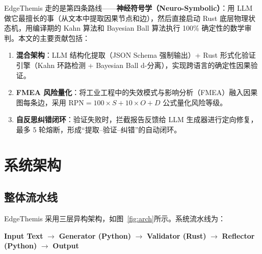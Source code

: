 \documentclass[12pt, a4paper]{ctexart}
\begin{document}
EdgeThemis 走的是第四条路线——\textbf{神经符号学（Neuro-Symbolic）}：用 LLM 做它最擅长的事（从文本中提取因果节点和边），然后直接启动 Rust 底层物理状态机，用编译期的 Kahn 算法和 Bayesian Ball 算法执行 100\% 确定性的数学审判。本文的主要贡献包括：

\begin{enumerate}[label=(\arabic*)]
  \item \textbf{混合架构}：LLM 结构化提取（JSON Schema 强制输出）+ Rust 形式化验证引擎（Kahn 环路检测 + Bayesian Ball d-分离），实现跨语言的确定性因果验证。

  \item \textbf{FMEA 风险量化}：将工业工程中的失效模式与影响分析（FMEA）融入因果图每条边，采用 RPN$=100 \times S + 10 \times O + D$ 公式量化风险等级。

  \item \textbf{自反思纠错闭环}：验证失败时，拦截报告反馈给 LLM 生成器进行定向修复，最多 5 轮熔断，形成``提取--验证--纠错''的自动闭环。
\end{enumerate}

\section{系统架构}

\subsection{整体流水线}

EdgeThemis 采用三层异构架构，如图~\ref{fig:arch}所示。系统流水线为：

\begin{center}
\textbf{Input Text} $\to$ \textbf{Generator (Python)} $\to$ \textbf{Validator (Rust)} $\to$ \textbf{Reflector (Python)} $\to$ \textbf{Output}
\end{center}
\end{document}
